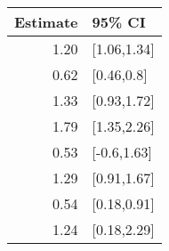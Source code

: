 \begin{tabular}{rl}
  \hline
Estimate & 95\% CI \\ 
  \hline
1.20 & [1.06,1.34] \\ 
  0.62 & [0.46,0.8] \\ 
  1.33 & [0.93,1.72] \\ 
  1.79 & [1.35,2.26] \\ 
  0.53 & [-0.6,1.63] \\ 
  1.29 & [0.91,1.67] \\ 
  0.54 & [0.18,0.91] \\ 
  1.24 & [0.18,2.29] \\ 
   \hline
\end{tabular}

